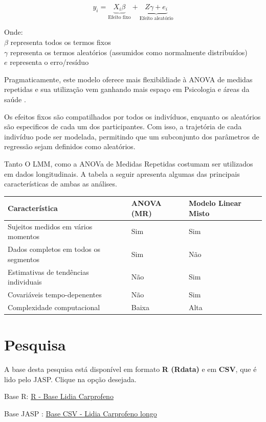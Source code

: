 \documentclass[
]{book}
\begin{document}
\[y_i = \underbrace{X_i\beta}_\text{Efeito fixo} + \underbrace{Z\gamma + e_i}_\text{Efeito aleatório}\]

Onde:\\
\(\beta\) representa todos os termos fixos\\
\(\gamma\) representa os termos aleatórios (assumidos como normalmente distribuídos)\\
\(e\) representa o erro/resíduo

Pragmaticamente, este modelo oferece mais flexibildiade à ANOVA de medidas repetidas e sua utilização vem ganhando mais espaço em Psicologia e áreas da saúde \citep{Gueorguieva2004}.

Os efeitos fixos são compatilhados por todos os indivíduos, enquanto os aleatórios são especificos de cada um dos participantes. Com isso, a trajetória de cada indivíduo pode ser modelada, permitindo que um subconjunto dos parâmetros de regressão sejam definidos como aleatórios.

Tanto O LMM, como a ANOVa de Medidas Repetidas costumam ser utilizados em dados longitudinais. A tabela a seguir apresenta algumas das principais características de ambas as análises.

\begin{longtable}[]{@{}lll@{}}
\toprule
Característica & ANOVA (MR) & Modelo Linear Misto\tabularnewline
\midrule
\endhead
Sujeitos medidos em vários momentos & Sim & Sim\tabularnewline
Dados completos em todos os segmentos & Sim & Não\tabularnewline
Estimativas de tendências individuais & Não & Sim\tabularnewline
Covariáveis tempo-depenentes & Não & Sim\tabularnewline
Complexidade computacional & Baixa & Alta\tabularnewline
\bottomrule
\end{longtable}

\hypertarget{pesquisa-6}{%
\section{Pesquisa}\label{pesquisa-6}}

\begin{base}

A base desta pesquisa está disponível em formato \textbf{R (Rdata)} e em \textbf{CSV}, que é lido pelo JASP. Clique na opção desejada.

Base R: \href{https://github.com/anovabr/mqt/raw/master/bases/R\%20-\%20Base\%20Lidia\%20Carprofeno.RData}{R - Base Lidia Carprofeno}

Base JASP : \href{https://github.com/anovabr/mqt/raw/master/bases/bases_csv_jasp.zip}{Base CSV - Lidia Carprofeno longo}

\end{base}
\end{document}
